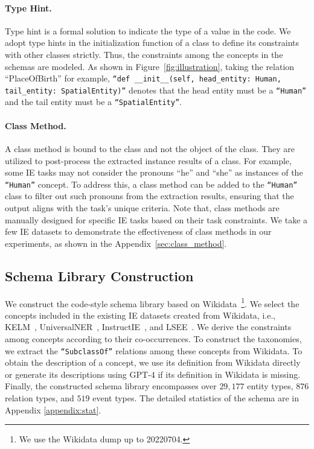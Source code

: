  \paragraph{Type Hint.} Type hint is a formal solution to indicate the type of
  a value in the code. We adopt type hints in the initialization function of a
  class to define its constraints with other classes strictly. Thus, the
  constraints among the concepts in the schemas are modeled. As shown in
  Figure~\ref{fig:illustration}, taking the relation ``PlaceOfBirth'' for
  example, \texttt{``def \_\_init\_\_(self, head\_entity: \textcolor{darkgreen}{Human}, tail\_entity:
  \textcolor{darkgreen}{SpatialEntity})''} denotes that the head entity must be a \texttt{``\textcolor{darkgreen}{Human}''} and the tail
  entity must be a \texttt{``\textcolor{darkgreen}{SpatialEntity}''}.

  \paragraph{Class Method.} A class method is bound to the class and not the
 object of the class. They are utilized to post-process the extracted instance
 results of a class. For example, some IE tasks may not consider the pronouns
 ``he'' and ``she'' as instances of the \texttt{``\textcolor{darkgreen}{Human}''} concept. To address this, a
 class method can be added to the \texttt{``\textcolor{darkgreen}{Human}''} class to filter out such pronouns
 from the extraction results, ensuring that the output aligns with the task's
 unique criteria. Note that, class methods are manually designed for specific IE
 tasks based on their task constraints. We take a few IE datasets to demonstrate
 the effectiveness of class methods in our experiments, as shown in the
 Appendix~\ref{sec:class_method}.

\subsection{Schema Library Construction}
We construct the code-style schema library based on Wikidata~\footnote{We use the Wikidata dump up to 20220704.}. We
select the concepts included in the existing IE datasets created from Wikidata, i.e., KELM~\cite{agarwal-etal-2021-knowledge}, UniversalNER~\cite{zhou2023universalner}, InstructIE~\cite{knowlm}, and LSEE~\cite{chen-etal-2017-automatically}. We derive the constraints among concepts according to their co-occurrences. To construct the taxonomies, we
extract the \texttt{``\textcolor{darkgreen}{SubclassOf}''} relations among these concepts from Wikidata. To obtain the description of a concept, we use its definition from Wikidata directly or generate its descriptions using GPT-4 if its definition in Wikidata
is missing. Finally, the constructed schema library encompasses over $29,177$ entity types, $876$ relation types, and $519$ event types. The detailed statistics of the schema are in Appendix \ref{appendix:stat}.

